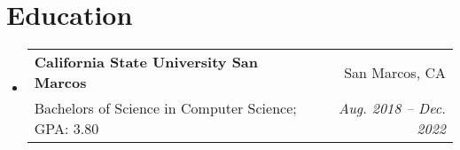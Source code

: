 \documentclass[letterpaper,11pt]{article}
\makeatletter
\newcommand{\resumeSubheading}[4]{
  \vspace{-1pt}\item
    \begin{tabular*}{0.97\textwidth}{l@{\extracolsep{\fill}}r}
      \textbf{#1} & #2 \\
      {\small#3} & \textit{\small #4} \\
    \end{tabular*}\vspace{-5pt}
}
\newcommand{\resumeSubHeadingListStart}{\begin{itemize}[leftmargin=*]}
\newcommand{\resumeSubHeadingListEnd}{\end{itemize}}
\makeatother
\begin{document}
\section{Education}
  \resumeSubHeadingListStart
    \resumeSubheading
      {California State University San Marcos}{San Marcos, CA}
      {Bachelors of Science in Computer Science;  GPA: 3.80}{Aug. 2018 -- Dec. 2022}
  \resumeSubHeadingListEnd

  \begin{comment}
  \section{Coursework}
  \resumeSubHeadingListStart
    \item{
      \textbf{Courses}{: Cloud Computing, Embedded Systems, Web Development, Operating Systems \& Architecture, Database Systems, Software Engineering, Data Structures \& Algorithms}
      \hfill
    }
  \resumeSubHeadingListEnd
  \end{comment}



\end{document}
